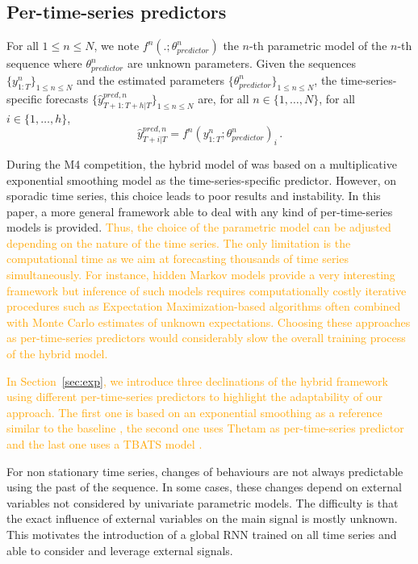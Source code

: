 \documentclass[10pt]{article} %
\newcommand{\ts}{y}
\newcommand{\tspred}{\widehat{\ts}}
\newcommand{\stat}{f}
\newcommand{\statparam}{\theta_{predictor}}
\newcommand{\lag}{h}
\begin{document}
\subsection{Per-time-series predictors}
For all $1\leqslant n \leqslant N$, we note $\stat^n(.;\statparam^n)$ the $n$-th parametric model of the $n$-th sequence where $\statparam^n$ are  unknown parameters. Given the sequences $\{\ts^n_{1:T}\}_{1\leqslant n \leqslant N}$ and the estimated  parameters $\{\statparam^n\}_{1\leqslant n \leqslant N}$, the time-series-specific forecasts $\{\tspred^{pred,n}_{T+1:T+\lag|T}\}_{1\leqslant n \leqslant N}$ are, for all $n \in \{1,\ldots,N\}$, for all $i \in \{1,\ldots,\lag\}$,
\begin{equation}
    \label{eq:predictors}
    \tspred^{pred,n}_{T+i|T} = \stat^n(\ts^n_{1:T};\statparam^n)_i\,.
\end{equation}

During the M4 competition, the hybrid model of \citet{smyl2020} was based on a multiplicative exponential smoothing model as the time-series-specific predictor. However, on sporadic time series, this choice leads to poor results and instability. In this paper, a more general framework able to deal with any kind of per-time-series models is provided. \textcolor{orange}{Thus, the choice of the parametric model can be adjusted depending on the nature of the time series. The only limitation is the computational time as we aim at forecasting thousands of time series simultaneously. For instance, hidden Markov models provide a very interesting framework but inference of such models requires computationally costly iterative procedures such as Expectation Maximization-based algorithms often combined with Monte Carlo estimates of unknown expectations. Choosing these approaches as per-time-series predictors would considerably slow the overall training process of the hybrid model.} 

\textcolor{orange}{In Section~\ref{sec:exp}, we introduce three declinations of the hybrid framework  using different per-time-series predictors to highlight the adaptability of our approach. The first one is based on an  exponential smoothing as a reference similar to the baseline \citet{smyl2020}, the second one uses Thetam as per-time-series predictor \citep{hyndman2020} and the last one uses a TBATS model \citep{alysha2011}.}

For non stationary time series, changes of behaviours are not always predictable using the past of the sequence. In some cases, these changes depend on external variables not considered by univariate parametric models. The difficulty is that the exact influence of external variables on the main signal is mostly unknown. This motivates the introduction of a global RNN trained on all time series and able to consider and leverage external signals.
\end{document}
